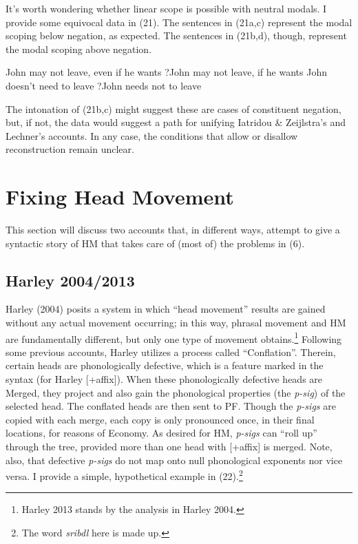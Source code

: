 \documentclass[]{ling-200b-2}
\begin{document}
It's worth wondering whether linear scope is possible with neutral modals. I provide some equivocal data in (21). The sentences in (21a,c) represent the modal scoping below negation, as expected. The sentences in (21b,d), though, represent the modal scoping above negation.
    
\pex  
\a John may not leave, even if he wants
\a ?John may not leave, if he wants
\a John doesn't need to leave
\a ?John needs not to leave
\xe
    
The intonation of (21b,c) might suggest these are cases of constituent negation, but, if not, the data would suggest a path for unifying Iatridou \& Zeijlstra's and Lechner's accounts. In any case, the conditions that allow or disallow reconstruction remain unclear.

\section{Fixing Head Movement}

This section will discuss two accounts that, in different ways, attempt to give a syntactic story of HM that takes care of (most of) the problems in (6).

\subsection{Harley 2004/2013}

Harley (2004) posits a system in which ``head movement'' results are gained without any actual movement occurring; in this way, phrasal movement and HM are fundamentally different, but only one type of movement obtains.\footnote{ Harley 2013 stands by the analysis in Harley 2004.} Following some previous accounts, Harley utilizes a process called ``Conflation''. Therein, certain heads are phonologically defective, which is a feature marked in the syntax (for Harley [+affix]). When these phonologically defective heads are Merged, they project and also gain the phonological properties (the \textit{p-sig}) of the selected head. The conflated heads are then sent to PF. Though the  \textit{p-sigs} are copied with each merge, each copy is only pronounced once, in their final locations, for reasons of Economy. As desired for HM, \textit{p-sigs} can ``roll up'' through the tree, provided more than one head with [+affix] is merged. Note, also, that defective \textit{p-sigs} do not map onto null phonological exponents nor vice versa. I provide a simple, hypothetical example in (22).\footnote{ The word \textit{sribdl} here is made up.}
\end{document}
